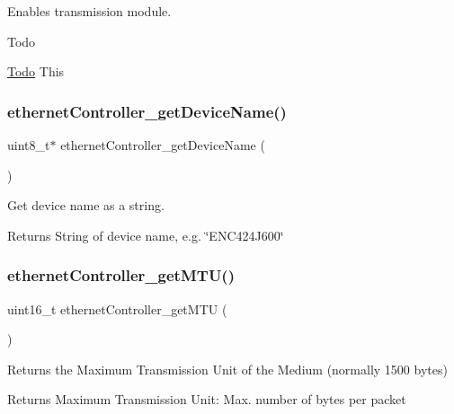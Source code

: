 Enables transmission module. 

\begin{DoxyRefDesc}{Todo}
\item[\mbox{\hyperlink{todo__todo000007}{Todo}}]This \end{DoxyRefDesc}
\mbox{\label{group__init_gae396f51c0fdba634e4e84b5f2b5d9416}} 
\subsubsection{\texorpdfstring{ethernetController\_getDeviceName()}{ethernetController\_getDeviceName()}}
{\footnotesize\ttfamily uint8\+\_\+t$\ast$ ethernet\+Controller\+\_\+get\+Device\+Name (\begin{DoxyParamCaption}{ }\end{DoxyParamCaption})}



Get device name as a string. 

\begin{DoxyReturn}{Returns}
String of device name, e.\+g. \char`\"{}\+E\+N\+C424\+J600\char`\"{} 
\end{DoxyReturn}
\mbox{\label{group__init_gabb37702e7cfbd10dc932ca6502fd7bae}} 
\subsubsection{\texorpdfstring{ethernetController\_getMTU()}{ethernetController\_getMTU()}}
{\footnotesize\ttfamily uint16\+\_\+t ethernet\+Controller\+\_\+get\+M\+TU (\begin{DoxyParamCaption}{ }\end{DoxyParamCaption})}



Returns the Maximum Transmission Unit of the Medium (normally 1500 bytes) 

\begin{DoxyReturn}{Returns}
Maximum Transmission Unit\+: Max. number of bytes per packet 
\end{DoxyReturn}
\mbox{\label{group__init_gaa3396c9822f00c6519a0e7a421048a71}} 
